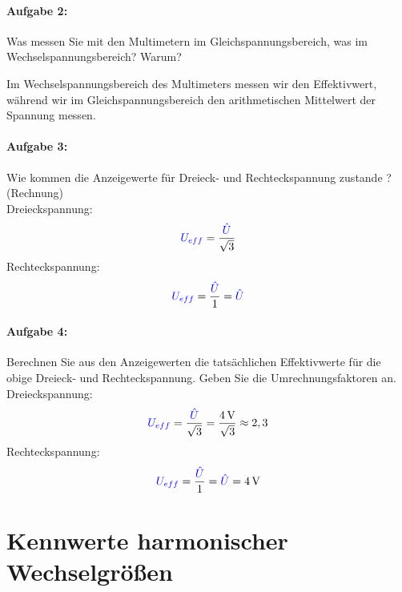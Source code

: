 \documentclass[11pt,a4paper,titlepage]{scrreprt}
\begin{document}
            \subsubsection{Aufgabe 2:} Was messen Sie mit den Multimetern im Gleichspannungsbereich, was im   Wechselspannungsbereich? Warum? 

			Im Wechselspannungsbereich des Multimeters messen wir den Effektivwert, während wir im Gleichspannungsbereich den arithmetischen Mittelwert der Spannung messen.
            
            \subsubsection{Aufgabe 3:} Wie kommen die Anzeigewerte für Dreieck- und Rechteckspannung zustande ?   (Rechnung)\\
            
            Dreieckspannung:
            \begin{equation*}
            	\textcolor{blue}{U_{eff}} = \frac{\textcolor{blue}{\hat{U}}}{\sqrt{3}}
            \end{equation*}
            Rechteckspannung:
            \begin{equation*}
            	\textcolor{blue}{U_{eff}} = \frac{\textcolor{blue}{\hat{U}}}{1} = \textcolor{blue}{\hat{U}}
            \end{equation*}
            \subsubsection{Aufgabe 4:} Berechnen Sie aus den Anzeigewerten die tatsächlichen Effektivwerte für die   obige Dreieck- und Rechteckspannung. Geben Sie die Umrechnungsfaktoren an.\\
            
            Dreieckspannung:
            \begin{equation*}
            	\textcolor{blue}{U_{eff}} = \frac{\textcolor{blue}{\hat{U}}}{\sqrt{3}} = \frac{\SI{4}{\volt}}{\sqrt{3}} \approx 2,3
            \end{equation*}
            Rechteckspannung:
            \begin{equation*}
            	\textcolor{blue}{U_{eff}} = \frac{\textcolor{blue}{\hat{U}}}{1} = \textcolor{blue}{\hat{U}} = \SI{4}{\volt}
            \end{equation*}                      
                
    \chapter{Kennwerte harmonischer Wechselgrößen}
     
\end{document}
